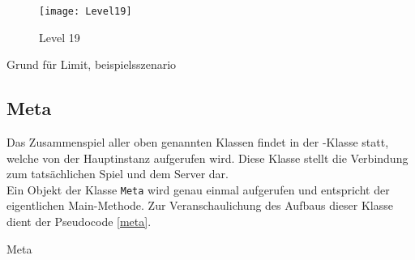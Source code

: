 \begin{figure}[H]
  \centering
    \texttt{[image: Level19]}
   \caption{Level 19}
   \label{lvl19}
\end{figure}


Grund für Limit, beispielsszenario


\subsection{Meta}
Das Zusammenspiel aller oben genannten Klassen findet in der -Klasse statt, welche von der Hauptinstanz  aufgerufen wird. Diese Klasse stellt die Verbindung zum tatsächlichen Spiel und dem Server dar. \\
Ein Objekt der Klasse \texttt{Meta} wird genau einmal aufgerufen und entspricht der eigentlichen Main-Methode. Zur Veranschaulichung des Aufbaus dieser Klasse dient der Pseudocode \ref{meta}.

\begin{algorithm}[H]
  \begin{algorithmic}[1]
  \EndIf
  \end{algorithmic}
  \caption{Meta \label{meta}}
\end{algorithm}